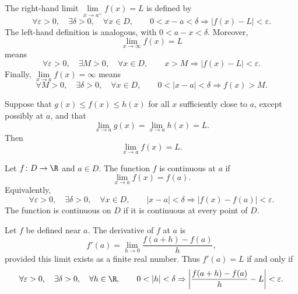     \begin{definition}
        The right-hand limit $\lim\limits_{x\to a^+}f(x)=L$ is defined by
        \[
            \forall\varepsilon>0,
            \quad
            \exists\delta>0,
            \quad
            \forall x\in D,
            \qquad
            0<x-a<\delta
            \Rightarrow
            |f(x)-L|<\varepsilon.
        \]
        The left-hand definition is analogous, with $0<a-x<\delta$.
        Moreover,
        \[
            \lim\limits_{x\to\infty}f(x)=L
        \]
        means
        \[
            \forall\varepsilon>0,
            \quad
            \exists M>0,
            \quad
            \forall x\in D,
            \qquad
            x>M\Rightarrow |f(x)-L|<\varepsilon.
        \]
        Finally, $\lim\limits_{x\to a}f(x)=\infty$ means
        \[
            \forall M>0,
            \quad
            \exists\delta>0,
            \quad
            \forall x\in D,
            \qquad
            0<|x-a|<\delta\Rightarrow f(x)>M.
        \]
    \end{definition}

    \begin{theorem}
        Suppose that $g(x)\leq f(x)\leq h(x)$ for all $x$ sufficiently close
        to $a$, except possibly at $a$, and that
        \[
            \lim\limits_{x\to a}g(x)
            =
            \lim\limits_{x\to a}h(x)
            =L.
        \]
        Then
        \[
            \lim\limits_{x\to a}f(x)=L.
        \]
    \end{theorem}

    \begin{definition}
        Let $f\colon D\to\R$ and $a\in D$. The function $f$ is continuous at $a$ if
        \[
            \lim\limits_{x\to a}f(x)=f(a).
        \]
        Equivalently,
        \[
            \forall\varepsilon>0,
            \quad
            \exists\delta>0,
            \quad
            \forall x\in D,
            \qquad
            |x-a|<\delta
            \Rightarrow
            |f(x)-f(a)|<\varepsilon.
        \]
        The function is continuous on $D$ if it is continuous at every point of
        $D$.
    \end{definition}

    \begin{definition}[Derivative]
        Let $f$ be defined near $a$. The derivative of $f$ at $a$ is
        \[
            f'(a)
            =
            \lim\limits_{h\to 0}\frac{f(a+h)-f(a)}{h},
        \]
        provided this limit exists as a finite real number. Thus $f'(a)=L$ if
        and only if
        \[
            \forall\varepsilon>0,
            \quad
            \exists\delta>0,
            \quad
            \forall h\in\R,
            \qquad
            0<|h|<\delta
            \Rightarrow
            \left|
                \frac{f(a+h)-f(a)}{h}-L
            \right|<\varepsilon.
        \]
    \end{definition}

